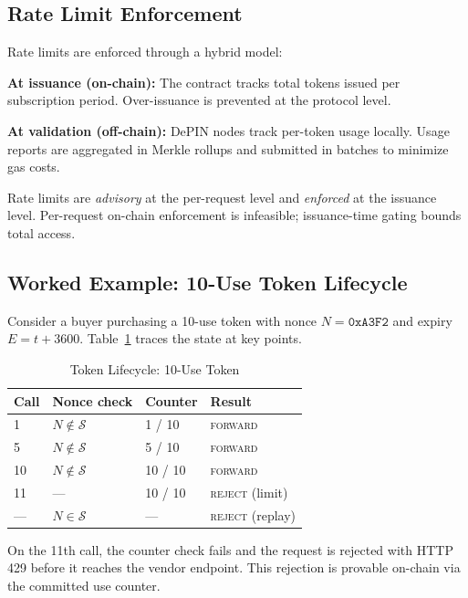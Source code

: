 \documentclass[conference]{IEEEtran}
\begin{document}
\subsection{Rate Limit Enforcement}
Rate limits are enforced through a hybrid model:

\textbf{At issuance (on-chain):} The contract tracks total tokens issued per subscription
period. Over-issuance is prevented at the protocol level.

\textbf{At validation (off-chain):} DePIN nodes track per-token usage locally. Usage
reports are aggregated in Merkle rollups and submitted in batches to minimize gas costs.

Rate limits are \emph{advisory} at the per-request level and \emph{enforced} at the
issuance level. Per-request on-chain enforcement is infeasible; issuance-time gating
bounds total access.

\subsection{Worked Example: 10-Use Token Lifecycle}
Consider a buyer purchasing a 10-use token with nonce $N = \texttt{0xA3F2}$ and expiry
$E = t + 3600$. Table~\ref{tab:lifecycle} traces the state at key points.

\begin{table}[h]
\caption{Token Lifecycle: 10-Use Token}
\label{tab:lifecycle}
\renewcommand{\arraystretch}{1.2}
\begin{tabular}{p{1.2cm}p{1.8cm}p{1.5cm}p{1.5cm}}
\toprule
\textbf{Call} & \textbf{Nonce check} & \textbf{Counter} & \textbf{Result} \\
\midrule
1 & $N \notin \mathcal{S}$ & 1 / 10 & \textsc{forward} \\
5 & $N \notin \mathcal{S}$ & 5 / 10 & \textsc{forward} \\
10 & $N \notin \mathcal{S}$ & 10 / 10 & \textsc{forward} \\
11 & --- & 10 / 10 & \textsc{reject} (limit) \\
--- & $N \in \mathcal{S}$ & --- & \textsc{reject} (replay) \\
\bottomrule
\end{tabular}
\end{table}

On the 11th call, the counter check fails and the request is rejected with HTTP 429
before it reaches the vendor endpoint. This rejection is provable on-chain via the
committed use counter.

\end{document}
